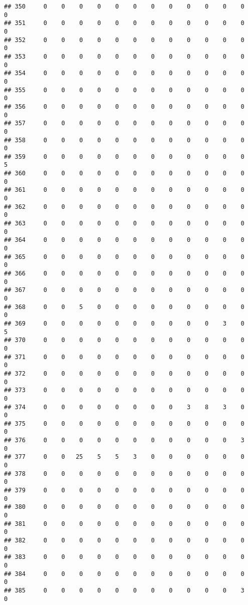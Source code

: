 \documentclass[]{article}
\begin{document}
\begin{verbatim}
## 350     0    0    0    0    0    0    0    0    0    0    0    0    0
## 351     0    0    0    0    0    0    0    0    0    0    0    0    0
## 352     0    0    0    0    0    0    0    0    0    0    0    0    0
## 353     0    0    0    0    0    0    0    0    0    0    0    0    0
## 354     0    0    0    0    0    0    0    0    0    0    0    0    0
## 355     0    0    0    0    0    0    0    0    0    0    0    0    0
## 356     0    0    0    0    0    0    0    0    0    0    0    0    0
## 357     0    0    0    0    0    0    0    0    0    0    0    0    0
## 358     0    0    0    0    0    0    0    0    0    0    0    0    0
## 359     0    0    0    0    0    0    0    0    0    0    0    0    5
## 360     0    0    0    0    0    0    0    0    0    0    0    0    0
## 361     0    0    0    0    0    0    0    0    0    0    0    0    0
## 362     0    0    0    0    0    0    0    0    0    0    0    0    0
## 363     0    0    0    0    0    0    0    0    0    0    0    0    0
## 364     0    0    0    0    0    0    0    0    0    0    0    0    0
## 365     0    0    0    0    0    0    0    0    0    0    0    0    0
## 366     0    0    0    0    0    0    0    0    0    0    0    0    0
## 367     0    0    0    0    0    0    0    0    0    0    0    0    0
## 368     0    0    5    0    0    0    0    0    0    0    0    0    0
## 369     0    0    0    0    0    0    0    0    0    0    3    0    5
## 370     0    0    0    0    0    0    0    0    0    0    0    0    0
## 371     0    0    0    0    0    0    0    0    0    0    0    0    0
## 372     0    0    0    0    0    0    0    0    0    0    0    0    0
## 373     0    0    0    0    0    0    0    0    0    0    0    0    0
## 374     0    0    0    0    0    0    0    0    3    8    3    0    0
## 375     0    0    0    0    0    0    0    0    0    0    0    0    0
## 376     0    0    0    0    0    0    0    0    0    0    0    3    0
## 377     0    0   25    5    5    3    0    0    0    0    0    0    0
## 378     0    0    0    0    0    0    0    0    0    0    0    0    0
## 379     0    0    0    0    0    0    0    0    0    0    0    0    0
## 380     0    0    0    0    0    0    0    0    0    0    0    0    0
## 381     0    0    0    0    0    0    0    0    0    0    0    0    0
## 382     0    0    0    0    0    0    0    0    0    0    0    0    0
## 383     0    0    0    0    0    0    0    0    0    0    0    0    0
## 384     0    0    0    0    0    0    0    0    0    0    0    0    0
## 385     0    0    0    0    0    0    0    0    0    0    0    3    0

\end{verbatim}
\end{document}

